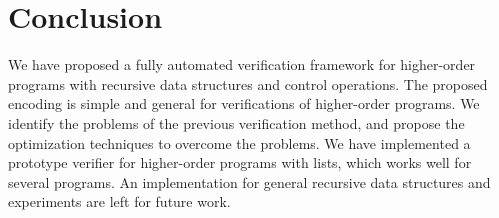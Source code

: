 \section{Conclusion}
\label{sec:conclusion}

We have proposed a fully automated verification framework for
higher-order programs with recursive data structures and control
operations.  The proposed encoding is simple and general for
verifications of higher-order programs.  We identify the problems of the
previous verification method, and propose the optimization techniques to
overcome the problems.  We have implemented a prototype verifier for
higher-order programs with lists, which works well for several programs.
An implementation for general recursive data structures and experiments
are left for future work.


